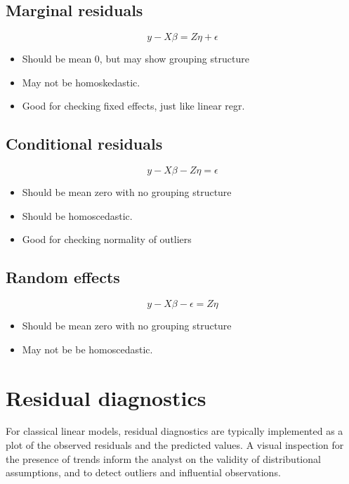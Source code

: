 \documentclass[main.tex]{subfiles}
\begin{document}
\newpage

\subsection*{Marginal residuals}

\[y - X\beta = Z \eta +\epsilon \]
\begin{itemize}
\item
Should be mean 0, but may show grouping structure
\item
May not be homoskedastic.
\item
Good for checking fixed effects, just like linear regr.
\end{itemize}
\subsection*{Conditional residuals}
\[y - X\beta - Z \eta = \epsilon \]
\begin{itemize}
\item
Should be mean zero with no grouping structure
\item
Should be homoscedastic.
\item
Good for checking normality of outliers
\end{itemize}

\subsection*{Random effects}
\[y - X\beta -\epsilon = Z \eta \]
\begin{itemize}
\item
Should be mean zero with no grouping structure
\item
May not be be homoscedastic.
\end{itemize}

\section{Residual diagnostics} %
For classical linear models, residual diagnostics are typically implemented as a plot of the observed residuals and the predicted values. A visual inspection for the presence of trends inform the analyst on the validity of distributional assumptions, and to detect outliers and influential observations.
\end{document}
